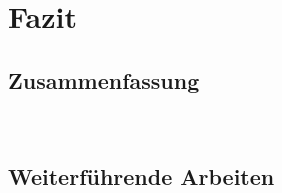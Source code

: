 \chapter{Fazit}
\label{cha:Fazit} \label{cha:Schluss}

\section{Zusammenfassung} ~\newline 

\section{Weiterführende Arbeiten}~\newline 